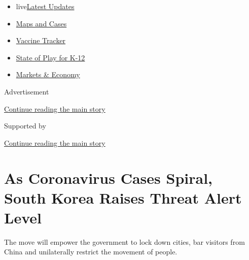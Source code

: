 \begin{itemize}
\tightlist
\item
  live\href{https://www.nytimes.com/2020/08/17/world/coronavirus-covid.html?name=styln-coronavirus-national\&region=TOP_BANNER\&variant=undefined\&block=storyline_menu_recirc\&action=click\&pgtype=Article\&impression_id=27009a00-e0fd-11ea-96b9-2bfa791110bd}{Latest
  Updates}
\item
  \href{https://www.nytimes.com/interactive/2020/us/coronavirus-us-cases.html?name=styln-coronavirus-national\&region=TOP_BANNER\&variant=undefined\&block=storyline_menu_recirc\&action=click\&pgtype=Article\&impression_id=27009a01-e0fd-11ea-96b9-2bfa791110bd}{Maps
  and Cases}
\item
  \href{https://www.nytimes.com/interactive/2020/science/coronavirus-vaccine-tracker.html?name=styln-coronavirus-national\&region=TOP_BANNER\&variant=undefined\&block=storyline_menu_recirc\&action=click\&pgtype=Article\&impression_id=27009a02-e0fd-11ea-96b9-2bfa791110bd}{Vaccine
  Tracker}
\item
  \href{https://www.nytimes.com/2020/08/17/us/k-12-schools-reopening.html?name=styln-coronavirus-national\&region=TOP_BANNER\&variant=undefined\&block=storyline_menu_recirc\&action=click\&pgtype=Article\&impression_id=27009a03-e0fd-11ea-96b9-2bfa791110bd}{State
  of Play for K-12}
\item
  \href{https://www.nytimes.com/live/2020/08/17/business/stock-market-today-coronavirus?name=styln-coronavirus-national\&region=TOP_BANNER\&variant=undefined\&block=storyline_menu_recirc\&action=click\&pgtype=Article\&impression_id=27009a04-e0fd-11ea-96b9-2bfa791110bd}{Markets
  \& Economy}
\end{itemize}

Advertisement

\protect\hyperlink{after-top}{Continue reading the main story}

Supported by

\protect\hyperlink{after-sponsor}{Continue reading the main story}

\hypertarget{as-coronavirus-cases-spiral-south-korea-raises-threat-alert-level}{%
\section{As Coronavirus Cases Spiral, South Korea Raises Threat Alert
Level}\label{as-coronavirus-cases-spiral-south-korea-raises-threat-alert-level}}

The move will empower the government to lock down cities, bar visitors
from China and unilaterally restrict the movement of people.

